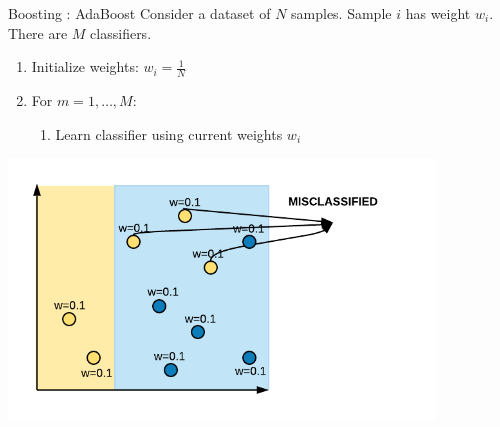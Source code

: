 \documentclass[aspectratio=169,10pt]{beamer}
\newcommand{\fitpic}[1]{\begin{adjustbox}{max width=\linewidth, max totalheight=0.78\textheight}#1\end{adjustbox}}
\begin{document}
\begin{frame}{Boosting : AdaBoost }
  Consider a dataset of $N$ samples. Sample $i$ has weight $w_i$. There are $M$ classifiers.\\[0.3cm]
  \begin{enumerate}
    \item Initialize weights: $w_i = \frac{1}{N}$
    \item For $m = 1, \ldots, M$:
          \begin{enumerate}
            \item Learn classifier using current weights $w_i$
          \end{enumerate}
  \end{enumerate}
  \centering
  \fitpic{\includegraphics[width=0.85\textwidth]{../assets/ensemble/diagrams/ada_iter1_misclassify}}
\end{frame}
\end{document}
